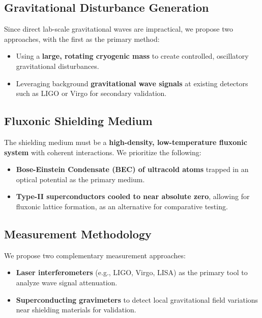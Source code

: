 \documentclass{article}
\begin{document}
\subsection{Gravitational Disturbance Generation}
Since direct lab-scale gravitational waves are impractical, we propose two approaches, with the first as the primary method:
\begin{itemize}
    \item Using a \textbf{large, rotating cryogenic mass} to create controlled, oscillatory gravitational disturbances.
    \item Leveraging background \textbf{gravitational wave signals} at existing detectors such as LIGO or Virgo for secondary validation.
\end{itemize}

\subsection{Fluxonic Shielding Medium}
The shielding medium must be a \textbf{high-density, low-temperature fluxonic system} with coherent interactions. We prioritize the following:
\begin{itemize}
    \item \textbf{Bose-Einstein Condensate (BEC) of ultracold atoms} trapped in an optical potential as the primary medium.
    \item \textbf{Type-II superconductors cooled to near absolute zero}, allowing for fluxonic lattice formation, as an alternative for comparative testing.
\end{itemize}

\subsection{Measurement Methodology}
We propose two complementary measurement approaches:
\begin{itemize}
    \item \textbf{Laser interferometers} (e.g., LIGO, Virgo, LISA) as the primary tool to analyze wave signal attenuation.
    \item \textbf{Superconducting gravimeters} to detect local gravitational field variations near shielding materials for validation.
\end{itemize}
\end{document}
